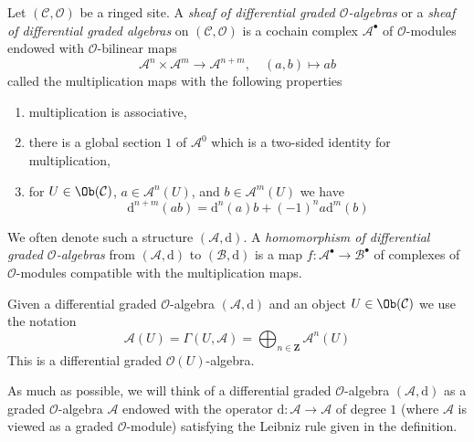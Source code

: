 \begin{definition}
\label{definition-dga}
Let $(\mathcal{C}, \mathcal{O})$ be a ringed site. A
{\it sheaf of differential graded $\mathcal{O}$-algebras}
or a {\it sheaf of differential graded algebras} on
$(\mathcal{C}, \mathcal{O})$ is a cochain complex
$\mathcal{A}^\bullet$ of $\mathcal{O}$-modules
endowed with $\mathcal{O}$-bilinear maps
$$
\mathcal{A}^n \times \mathcal{A}^m \to \mathcal{A}^{n + m},\quad
(a, b) \longmapsto ab
$$
called the multiplication maps with the following properties
\begin{enumerate}
\item multiplication is associative,
\item there is a global section $1$ of $\mathcal{A}^0$
which is a two-sided identity for multiplication,
\item for $U \in \Ob(\mathcal{C})$, $a \in \mathcal{A}^n(U)$, and
$b \in \mathcal{A}^m(U)$ we have
$$
\text{d}^{n + m}(ab) = \text{d}^n(a)b + (-1)^n a\text{d}^m(b)
$$
\end{enumerate}
We often denote such a structure $(\mathcal{A}, \text{d})$.
A {\it homomorphism of differential graded $\mathcal{O}$-algebras}
from $(\mathcal{A}, \text{d})$ to $(\mathcal{B}, \text{d})$ is a map
$f : \mathcal{A}^\bullet \to \mathcal{B}^\bullet$ of complexes
of $\mathcal{O}$-modules compatible with the multiplication maps.
\end{definition}

\noindent
Given a differential graded $\mathcal{O}$-algebra $(\mathcal{A}, \text{d})$
and an object $U \in \Ob(\mathcal{C})$ we use the notation
$$
\mathcal{A}(U) =
\Gamma(U, \mathcal{A}) =
\bigoplus\nolimits_{n \in \mathbf{Z}} \mathcal{A}^n(U)
$$
This is a differential graded $\mathcal{O}(U)$-algebra.

\medskip\noindent
As much as possible, we will think of a differential graded
$\mathcal{O}$-algebra $(\mathcal{A}, \text{d})$
as a graded $\mathcal{O}$-algebra $\mathcal{A}$ endowed with
the operator $\text{d} : \mathcal{A} \to \mathcal{A}$ of degree $1$
(where $\mathcal{A}$ is viewed as a graded $\mathcal{O}$-module)
satisfying the Leibniz rule given in the definition.

